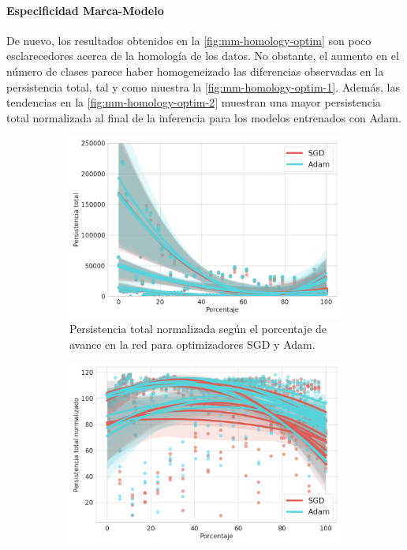 \paragraph{Especificidad Marca-Modelo}

De nuevo, los resultados obtenidos en la \autoref{fig:mm-homology-optim} son poco esclarecedores acerca de la homología de los datos. No obstante, el aumento en el número de clases parece haber homogeneizado las diferencias observadas en la persistencia total, tal y como muestra la \autoref{fig:mm-homology-optim-1}. Además, las tendencias en la \autoref{fig:mm-homology-optim-2} muestran una mayor persistencia total normalizada al final de la inferencia para los modelos entrenados con Adam.

\begin{figure}[H]
	\centering
	\begin{subfigure}{.5\textwidth}
		\centering
		\includegraphics[width=\linewidth]{img/mm_optim.png}
		\caption{Persistencia total normalizada según el porcentaje de avance en la red para optimizadores SGD y Adam.}
		\label{fig:mm-homology-optim-1}
	\end{subfigure}%
	\begin{subfigure}{.5\textwidth}
		\centering
		\includegraphics[width=\linewidth]{img/mm_optim_norm.png}

\end{subfigure}
\end{figure}
